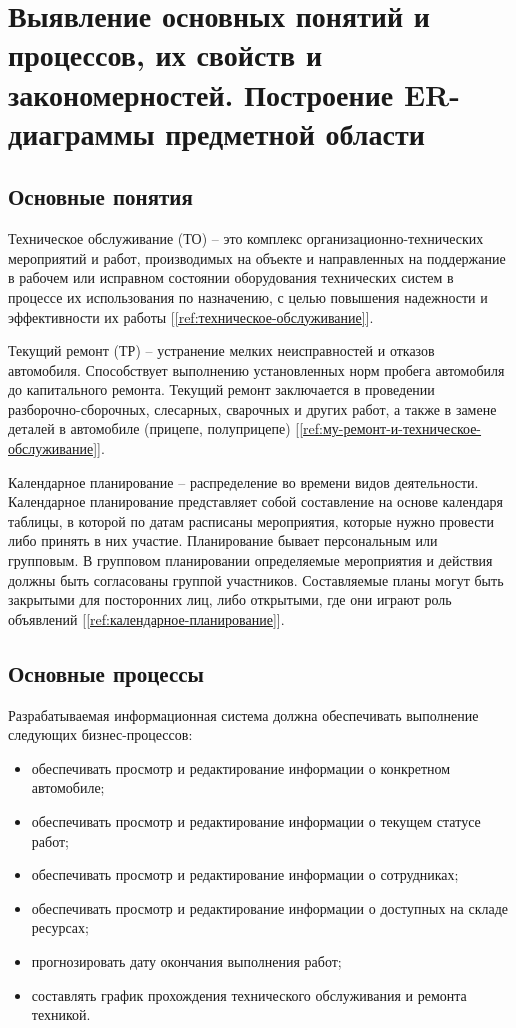 \documentclass[../nirs.tex]{subfiles}
\begin{document}
\section{Выявление основных понятий и процессов, их свойств и закономерностей.
Построение ER-диаграммы предметной области}

\subsection{Основные понятия}
Техническое обслуживание (ТО) -- это комплекс организационно-технических мероприятий
и работ, производимых на объекте и направленных на поддержание в рабочем или
исправном состоянии оборудования технических систем в процессе их использования
по назначению, с целью повышения надежности и эффективности их работы
[\ref{ref:техническое-обслуживание}].

Текущий ремонт (ТР) -- устранение мелких неисправностей и отказов автомобиля.
Способствует выполнению установленных норм пробега автомобиля до капитального
ремонта. Текущий ремонт заключается в проведении разборочно-сборочных,
слесарных, сварочных и других работ, а также в замене деталей в автомобиле
(прицепе, полуприцепе) [\ref{ref:му-ремонт-и-техническое-обслуживание}].

Календарное планирование -- распределение во времени видов деятельности.
Календарное планирование представляет собой составление на основе календаря
таблицы, в которой по датам расписаны мероприятия, которые нужно провести либо
принять в них участие.
Планирование бывает персональным или групповым.
В групповом планировании определяемые мероприятия и действия должны быть
согласованы группой участников.
Составляемые планы могут быть закрытыми для посторонних лиц, либо открытыми, где
они играют роль объявлений [\ref{ref:календарное-планирование}].

\subsection{Основные процессы}
Разрабатываемая информационная система должна обеспечивать выполнение следующих
бизнес-процессов:
\begin{itemize}
	\item обеспечивать просмотр и редактирование информации о конкретном
		автомобиле;
	\item обеспечивать просмотр и редактирование информации о текущем статусе
		работ;
	\item обеспечивать просмотр и редактирование информации о сотрудниках;
	\item обеспечивать просмотр и редактирование информации о доступных на
		складе ресурсах;
	\item прогнозировать дату окончания выполнения работ;
	\item составлять график прохождения технического обслуживания и ремонта
		техникой.
\end{itemize}
\end{document}
